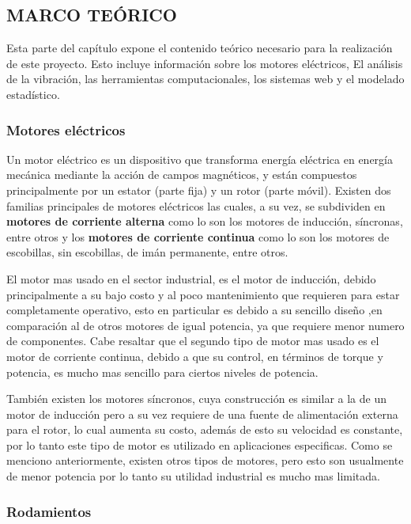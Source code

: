 \subsection{MARCO TEÓRICO}

Esta parte del capítulo expone el contenido teórico necesario para la
realización de este proyecto. Esto incluye información sobre los motores
eléctricos, El análisis de la vibración, las herramientas computacionales, los
sistemas web y el modelado estadístico.



\subsubsection{ Motores eléctricos}

Un motor eléctrico es un dispositivo que transforma energía eléctrica en
energía mecánica mediante la acción de campos magnéticos, y están compuestos
principalmente por un estator (parte fija) y un rotor (parte móvil).
Existen dos familias principales de motores eléctricos las cuales, a su vez,
se subdividen en \textbf{motores de corriente alterna} como lo son los  motores
de inducción, síncronas, entre otros y los \textbf{motores de corriente continua}
como lo son los motores de escobillas,  sin escobillas, de imán permanente,
entre otros.

El motor mas usado en el sector industrial, es el motor de inducción, debido
principalmente a su bajo costo y al poco mantenimiento que requieren para estar
completamente operativo, esto en particular es debido a su sencillo diseño
,en comparación al de otros motores de igual potencia, ya que requiere  menor
numero de componentes. Cabe resaltar que el segundo tipo de motor mas usado es
el motor de corriente
continua, debido a que su control, en términos de torque y potencia, es mucho
mas sencillo para ciertos niveles de potencia.

También existen los motores síncronos, cuya construcción es similar a la de un
motor de inducción pero a su vez requiere de una fuente de alimentación externa
para el rotor, lo cual aumenta su costo, además de esto su velocidad es
constante, por lo tanto este tipo de motor es utilizado en aplicaciones
especificas. Como se menciono anteriormente, existen otros tipos de motores,
pero esto son usualmente de menor potencia por
lo tanto su utilidad industrial es mucho mas limitada.


\subsubsection*{Rodamientos}

